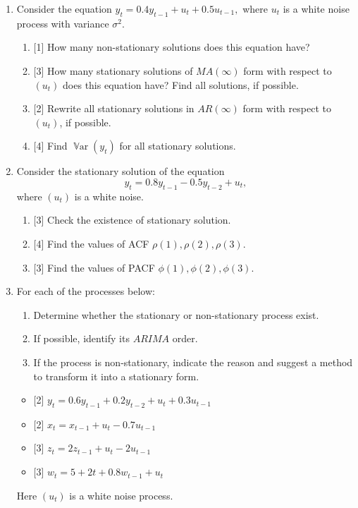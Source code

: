\documentclass[12pt]{article}
\DeclareMathOperator{\Var}{\mathbb{V}ar}
\begin{document}
\begin{enumerate}
\newpage
\item Consider the equation
\(
y_t = 0.4 y_{t-1} + u_t + 0.5 u_{t-1},
\)
where \( u_t \) is a white noise process with variance $\sigma^2$.
\begin{enumerate}
    \item {[1]} How many non-stationary solutions does this equation have?
    \item {[3]} How many stationary solutions of $MA(\infty)$ form with respect to $(u_t)$ does this equation have? Find all solutions, if possible.
    \item {[2]} Rewrite all stationary solutions in $AR(\infty)$ form with respect to $(u_t)$, if possible.
    \item {[4]} Find $\Var(y_t)$ for all stationary solutions.
\end{enumerate}

\item Consider the stationary solution of the equation
\[
y_t = 0.8 y_{t-1} - 0.5 y_{t-2} + u_t, 
\]
where $(u_t)$ is a white noise.
\begin{enumerate}
    \item {[3]} Check the existence of stationary solution.
    \item {[4]} Find the values of ACF \( \rho(1), \rho(2), \rho(3) \).
    \item {[3]} Find the values of PACF \( \phi(1), \phi(2), \phi(3)\).
\end{enumerate}

\item For each of the processes below: 
\begin{enumerate}
    \item Determine whether the stationary or non-stationary process exist.
    \item If possible, identify its $ARIMA$ order. 
    \item If the process is non-stationary, indicate the reason and suggest a method to transform it into a stationary form.
\end{enumerate}

\begin{itemize}
    \item {[2]} \(y_t = 0.6 y_{t-1} + 0.2 y_{t-2} + u_t + 0.3 u_{t-1}\)
    \item {[2]} \(x_t = x_{t-1} + u_t - 0.7 u_{t-1} \)
    \item {[3]} \(z_t = 2 z_{t-1} + u_t - 2 u_{t-1}\)
    \item {[3]} \(w_t = 5 + 2t + 0.8 w_{t-1} + u_t\)
\end{itemize}

Here $(u_t)$ is a white noise process.

\end{enumerate}
\end{document}
